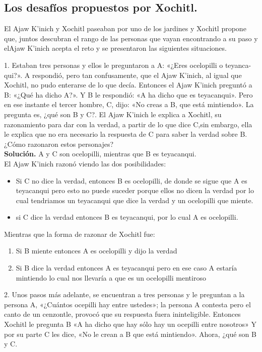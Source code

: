 \subsection{Los desafíos propuestos por Xochitl.}
El Ajaw K’inich y Xochitl paseaban por uno de los jardines y Xochitl propone que, juntos descubran el rango de las personas que vayan encontrando a su paso y elAjaw K’inich acepta el reto y se presentaron las siguientes situaciones.

1. Estaban tres personas y ellos le preguntaron a A: «¿Eres ocelopilli o teyanca-qui?». A respondió, pero tan confusamente, que el Ajaw K’inich, al igual que Xochitl, no pudo enterarse de lo que decía. Entonces el Ajaw K’inich preguntó a B: «¿Qué ha dicho A?». Y B le respondió: «A ha dicho que es teyacanqui». Pero en ese instante el tercer hombre, C, dijo: «No creas a B, que está mintiendo». La pregunta es, ¿qué son B y C?. El Ajaw K’inich le explica a Xochitl, su razonamiento para dar con la verdad, a partir de lo que dice C,sin embargo, ella le explica que no era necesario la respuesta de C para saber la verdad sobre B. ¿Cómo razonaron estos personajes?
\\
\textbf{Solución.} A y C son ocelopilli, mientras que B es teyacanqui.\\

El Ajaw K'inich razonó viendo las dos posibilidades:
\begin{itemize}
    \item Si C no dice la verdad, entonces B es ocelopilli, de donde se sigue que A es teyacanqui pero esto no puede suceder porque ellos no dicen la verdad por lo cual tendriamos un teyacanqui que dice la verdad y un ocelopilli que miente.
    \item si C dice la verdad entonces B es teyacanqui, por lo cual A es ocelopilli. 
\end{itemize}

Mientras que la forma de razonar de Xochitl fue:
\begin{enumerate}
    \item Si B miente entonces A es ocelopilli y dijo la verdad
    \item Si B dice la verdad entonces A es teyacanqui pero en ese caso A estaría mintiendo lo cual nos llevaría a que es un ocelopilli mentiroso
\end{enumerate}

2. Unos pasos más adelante, se encuentran a tres personas y le preguntan a la persona A, «¿Cuántos ocepilli hay entre ustedes»; la persona A contesta pero el canto de un cenzontle, provocó que su respuesta fuera ininteligible. Entonces Xochitl le pregunta B «A ha dicho que hay sólo hay un ocepilli entre nosotros» Y por su parte C les dice, «No le crean a B que está mintiendo». Ahora, ¿qué son B y C.

